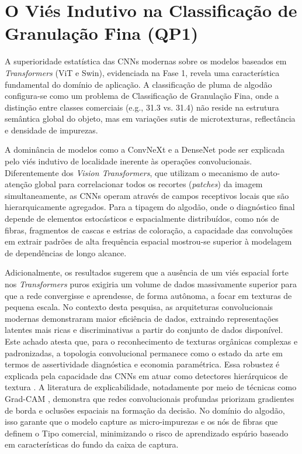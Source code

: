 \section{O Viés Indutivo na Classificação de Granulação Fina (QP1)}
\label{sec:vies_indutivo}

A superioridade estatística das CNNs modernas sobre os modelos baseados em \textit{Transformers} (ViT e Swin), evidenciada na Fase 1, revela uma característica fundamental do domínio de aplicação. A classificação de pluma de algodão configura-se como um problema de Classificação de Granulação Fina, onde a distinção entre classes comerciais (e.g., 31.3 vs. 31.4) não reside na estrutura semântica global do objeto, mas em variações sutis de microtexturas, reflectância e densidade de impurezas.

A dominância de modelos como a ConvNeXt e a DenseNet pode ser explicada pelo viés indutivo de localidade inerente às operações convolucionais. Diferentemente dos \textit{Vision Transformers}, que utilizam o mecanismo de auto-atenção global para correlacionar todos os recortes (\textit{patches}) da imagem simultaneamente, as CNNs operam através de campos receptivos locais que são hierarquicamente agregados. Para a tipagem do algodão, onde o diagnóstico final depende de elementos estocásticos e espacialmente distribuídos, como nós de fibras, fragmentos de cascas e estrias de coloração, a capacidade das convoluções em extrair padrões de alta frequência espacial mostrou-se superior à modelagem de dependências de longo alcance.

Adicionalmente, os resultados sugerem que a ausência de um viés espacial forte nos \textit{Transformers} puros exigiria um volume de dados massivamente superior para que a rede convergisse e aprendesse, de forma autônoma, a focar em texturas de pequena escala. No contexto desta pesquisa, as arquiteturas convolucionais modernas demonstraram maior eficiência de dados, extraindo representações latentes mais ricas e discriminativas a partir do conjunto de dados disponível. Este achado atesta que, para o reconhecimento de texturas orgânicas complexas e padronizadas, a topologia convolucional permanece como o estado da arte em termos de assertividade diagnóstica e economia paramétrica. Essa robustez é explicada pela capacidade das CNNs em atuar como detectores hierárquicos de textura \cite{zeiler2014visualizing}. A literatura de explicabilidade, notadamente por meio de técnicas como Grad-CAM \cite{selvaraju2017gradcam}, demonstra que redes convolucionais profundas priorizam gradientes de borda e oclusões espaciais na formação da decisão. No domínio do algodão, isso garante que o modelo capture as micro-impurezas e os nós de fibras que definem o Tipo comercial, minimizando o risco de aprendizado espúrio baseado em características do fundo da caixa de captura.
